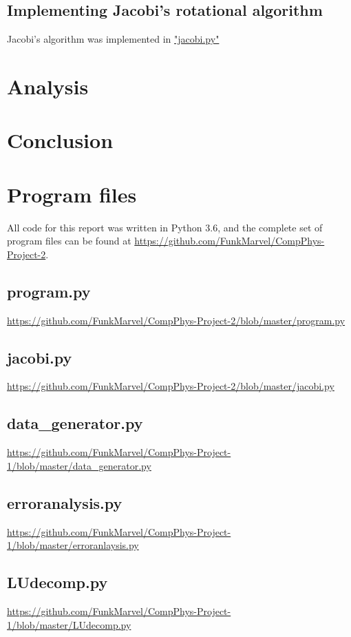 \documentclass[english,notitlepage,reprint]{revtex4-1}  %
\begin{document}
\subsection{Implementing Jacobi's rotational algorithm}\label{subsec:32}
Jacobi's algorithm was implemented in \hyperref[A:2]{"jacobi.py"}

\section{Analysis}\label{sec:4}

\section{Conclusion}\label{sec:5}

{}
\newpage
\appendix
\section{Program files} \label{A}
All code for this report was written in Python 3.6, and the complete set of program files can be found at \url{https://github.com/FunkMarvel/CompPhys-Project-2}.

\subsection{program.py}\label{A:1}
\url{https://github.com/FunkMarvel/CompPhys-Project-2/blob/master/program.py}

\subsection{jacobi.py}\label{A:2}
\url{https://github.com/FunkMarvel/CompPhys-Project-2/blob/master/jacobi.py}

\subsection{data\_generator.py} \label{A:3}
\url{https://github.com/FunkMarvel/CompPhys-Project-1/blob/master/data_generator.py}

\subsection{erroranalysis.py} \label{A:4}
\url{https://github.com/FunkMarvel/CompPhys-Project-1/blob/master/erroranlaysis.py}

\subsection{LUdecomp.py}\label{A:5}
\url{https://github.com/FunkMarvel/CompPhys-Project-1/blob/master/LUdecomp.py}
\end{document}

